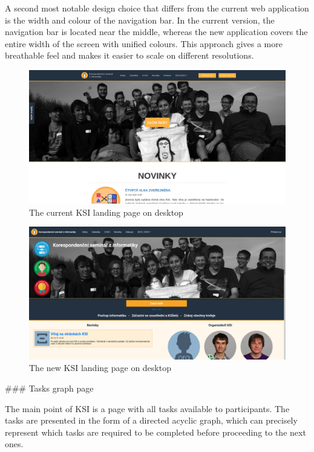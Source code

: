 \documentclass[
  digital, %
  oneside, %
  lof,     %
  nolot,     %
]{fithesis4}
\begin{document}
{A second most notable design choice that differs from the current web application is the width and colour of the navigation bar. In the current version, the navigation bar is located near the middle, whereas the new application covers the entire width of the screen with unified colours. This approach gives a more breathable feel and makes it easier to scale on different resolutions.

\begin{figure}
\includegraphics[width=\textwidth]{assets/img/welcome_curr}
\caption{The current KSI landing page on desktop}
\label{fig:welcome-curr}
\end{figure}

\begin{figure}
\includegraphics[width=\textwidth]{assets/img/welcome_new}
\caption{The new KSI landing page on desktop}
\label{fig:welcome-new}
\end{figure}

### Tasks graph page

The main point of KSI is a page with all tasks available to participants. The tasks are presented in the form of a directed acyclic graph, which can precisely represent which tasks are required to be completed before proceeding to the next ones.

}
\end{document}
